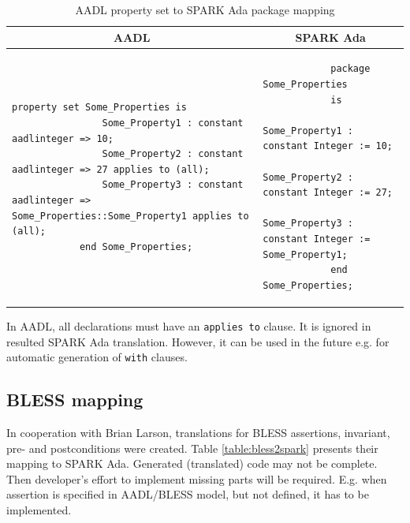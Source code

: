 \singlespacing
\begin{table}[!ht]
	\caption{AADL property set to SPARK Ada package mapping}
	\label{table:propertyset_mapping}
	\centering
  	\begin{tabular}{ | p{3in} | p{3in} |}

		\hline
		\multicolumn{1}{|c|}{\textbf{AADL}} & \multicolumn{1}{|c|}{\textbf{SPARK Ada}} \\ \hline

		\begin{lstlisting}[language=aadl]
			property set Some_Properties is
				Some_Property1 : constant aadlinteger => 10;
				Some_Property2 : constant aadlinteger => 27 applies to (all);
				Some_Property3 : constant aadlinteger => Some_Properties::Some_Property1 applies to (all);
			end Some_Properties;
		\end{lstlisting} 
		& 
		\begin{lstlisting}
			package Some_Properties
			is
				Some_Property1 : constant Integer := 10;
				Some_Property2 : constant Integer := 27;
				Some_Property3 : constant Integer := Some_Property1;
			end Some_Properties;
		\end{lstlisting} 		

		\\ \hline
	\end{tabular}
\end{table}
\doublespacing

In AADL, all declarations must have an \lstinline{applies to} clause. It is ignored in resulted SPARK Ada translation. However, it can be used in the future e.g. for automatic generation of \lstinline{with} clauses.


\subsection{BLESS mapping}
\label{codegen:mapping:bless}

In cooperation with Brian Larson, translations for BLESS assertions, invariant, pre- and postconditions were created. Table \ref{table:bless2spark} presents their mapping to SPARK Ada. Generated (translated) code may not be complete. Then developer's effort to implement missing parts will be required. E.g. when assertion is specified in AADL/BLESS model, but not defined, it has to be implemented.

